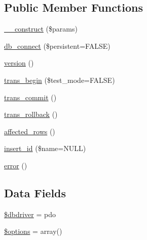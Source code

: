 \subsection*{Public Member Functions}
\begin{DoxyCompactItemize}
\item 
\hyperlink{class_c_i___d_b__pdo__driver_a9162320adff1a1a4afd7f2372f753a3e}{\+\_\+\+\_\+construct} (\$params)
\item 
\hyperlink{class_c_i___d_b__pdo__driver_a52bf595e79e96cc0a7c907a9b45aeb4d}{db\+\_\+connect} (\$persistent=F\+A\+L\+S\+E)
\item 
\hyperlink{class_c_i___d_b__pdo__driver_a6080dae0886626b9a4cedb29240708b1}{version} ()
\item 
\hyperlink{class_c_i___d_b__pdo__driver_a90e153cf190d273336d77cce930587e1}{trans\+\_\+begin} (\$test\+\_\+mode=F\+A\+L\+S\+E)
\item 
\hyperlink{class_c_i___d_b__pdo__driver_af4fbdcdace4aa94a139b64877601fe9b}{trans\+\_\+commit} ()
\item 
\hyperlink{class_c_i___d_b__pdo__driver_a53f76d4dfcd6ac04fb653982442aeef8}{trans\+\_\+rollback} ()
\item 
\hyperlink{class_c_i___d_b__pdo__driver_a77248aaad33eb132c04cc4aa3f4bc8cb}{affected\+\_\+rows} ()
\item 
\hyperlink{class_c_i___d_b__pdo__driver_ae61dc2c85e5516f143f6246c686bc3fc}{insert\+\_\+id} (\$name=N\+U\+L\+L)
\item 
\hyperlink{class_c_i___d_b__pdo__driver_a43b8d30b879d4f09ceb059b02af2bc02}{error} ()
\end{DoxyCompactItemize}
\subsection*{Data Fields}
\begin{DoxyCompactItemize}
\item 
\hyperlink{class_c_i___d_b__pdo__driver_a0cde2a16322a023d040aa7f725877597}{\$dbdriver} = \textquotesingle{}pdo\textquotesingle{}
\item 
\hyperlink{class_c_i___d_b__pdo__driver_a011800c63ece4cbbfa77136a20607023}{\$options} = array()
\end{DoxyCompactItemize}
